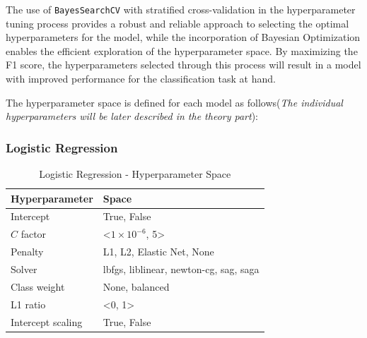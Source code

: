 The use of \lstinline{BayesSearchCV} with stratified cross-validation in the hyperparameter tuning process provides a robust and reliable approach to selecting the optimal hyperparameters for the model, while the incorporation of Bayesian Optimization enables the efficient exploration of the hyperparameter space.
By maximizing the F1 score, the hyperparameters selected through this process will result in a model with improved performance for the classification task at hand.

The hyperparameter space is defined for each model as follows(\textit{The individual hyperparameters will be later described in the theory part}):
\subsubsection{Logistic Regression}

\begin{table}[H]
\small
\setlength{\tabcolsep}{8pt}
\renewcommand{\arraystretch}{1.3}
\centering
    \caption[Logistic Regression - Hyperparameter Space]{Logistic Regression - Hyperparameter Space}\label{tab:lrspace}
    \begin{tabular}{ll}
\toprule
\textbf{Hyperparameter} & \textbf{Space}\\
\midrule
\hline
Intercept & True, False \\
$C$ factor & <$1\times10^{-6}$, 5>\\
Penalty & L1, L2, Elastic Net, None \\
Solver & lbfgs, liblinear, newton-cg, sag, saga \\
Class weight & None, balanced \\
L1 ratio & <0, 1> \\
Intercept scaling & True, False  \\
\hline
\bottomrule
\end{tabular}
\vspace{0.7em}

\vspace{-1em}
\end{table}


